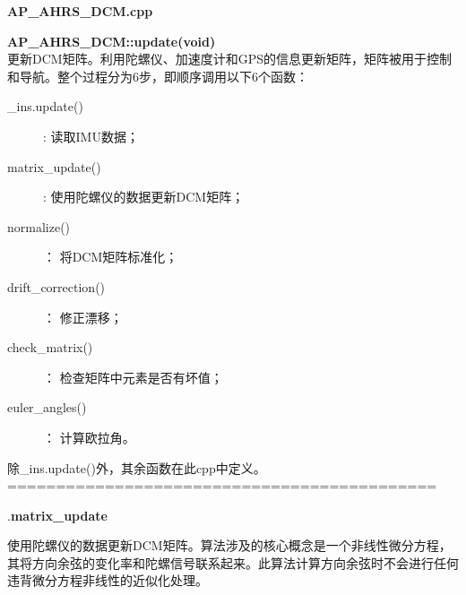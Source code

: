 \documentclass[a4paper,10pt]{ctexart} %
\begin{document}
\begin{center}
\textbf{AP\_AHRS\_DCM.cpp}
\end{center}

\noindent \textbf{AP\_AHRS\_DCM::update(void)}\\
更新DCM矩阵。利用陀螺仪、加速度计和GPS的信息更新矩阵，矩阵被用于控制和导航。整个过程分为6步，即顺序调用以下6个函数：
\begin{description}
\item [\_ins.update()]:			读取IMU数据；
\item [matrix\_update()]:		使用陀螺仪的数据更新DCM矩阵；
\item [normalize()]：			将DCM矩阵标准化；
\item [drift\_correction()]：	修正漂移；
\item [check\_matrix()]：		检查矩阵中元素是否有坏值；
\item[euler\_angles()]：			计算欧拉角。
\end{description}
除\_ins.update()外，其余函数在此cpp中定义。\\
============================================

.\textbf{matrix\_update}

使用陀螺仪的数据更新DCM矩阵。算法涉及的核心概念是一个非线性微分方程，其将方向余弦的变化率和陀螺信号联系起来。此算法计算方向余弦时不会进行任何违背微分方程非线性的近似化处理。
\end{document}
